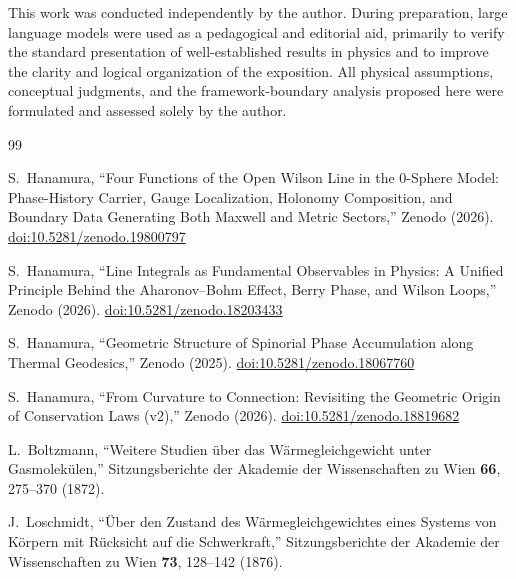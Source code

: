 \documentclass[%
 reprint, amsmath,amssymb, aps, prb, ]{revtex4-2}
\numberwithin{equation}{section}
\begin{document}

\begin{acknowledgments}
This work was conducted independently by the author. During preparation, large language models were used as a pedagogical and editorial aid, primarily to verify the standard presentation of well-established results in physics and to improve the clarity and logical organization of the exposition. All physical assumptions, conceptual judgments, and the framework-boundary analysis proposed here were formulated and assessed solely by the author.
\end{acknowledgments}



\begin{thebibliography}{99}


S.~Hanamura, ``Four Functions of the Open Wilson Line in the 0-Sphere Model: Phase-History Carrier, Gauge Localization, Holonomy Composition, and Boundary Data Generating Both Maxwell and Metric Sectors,'' Zenodo (2026). \href{https://doi.org/10.5281/zenodo.19800797}{doi:10.5281/zenodo.19800797}

S.~Hanamura, ``Line Integrals as Fundamental Observables in Physics: A Unified Principle Behind the Aharonov--Bohm Effect, Berry Phase, and Wilson Loops,'' Zenodo (2026). \href{https://doi.org/10.5281/zenodo.18203433}{doi:10.5281/zenodo.18203433}

S.~Hanamura, ``Geometric Structure of Spinorial Phase Accumulation along Thermal Geodesics,'' Zenodo (2025). \href{https://doi.org/10.5281/zenodo.18067760}{doi:10.5281/zenodo.18067760}

S.~Hanamura, ``From Curvature to Connection: Revisiting the Geometric Origin of Conservation Laws (v2),'' Zenodo (2026). \href{https://doi.org/10.5281/zenodo.18819682}{doi:10.5281/zenodo.18819682}

L.~Boltzmann, ``Weitere Studien \"uber das W\"armegleichgewicht unter Gasmolek\"ulen,'' Sitzungsberichte der Akademie der Wissenschaften zu Wien \textbf{66}, 275--370 (1872).

J.~Loschmidt, ``\"Uber den Zustand des W\"armegleichgewichtes eines Systems von K\"orpern mit R\"ucksicht auf die Schwerkraft,'' Sitzungsberichte der Akademie der Wissenschaften zu Wien \textbf{73}, 128--142 (1876).


\end{thebibliography}
\end{document}
